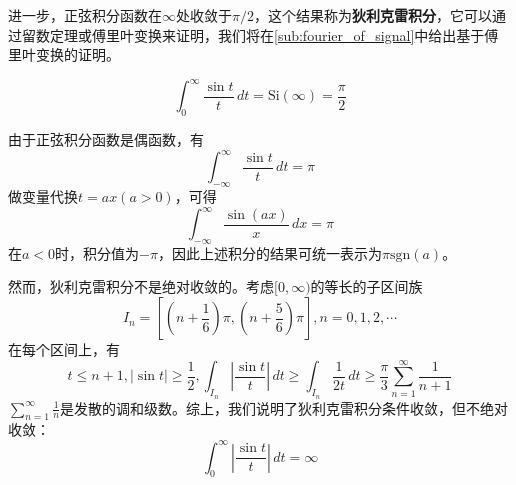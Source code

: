 进一步，正弦积分函数在$\infty$处收敛于$\pi/2$，这个结果称为\textbf{狄利克雷积分}，它可以通过留数定理或傅里叶变换来证明，我们将在\ref{sub:fourier_of_signal}中给出基于傅里叶变换的证明。
\begin{theorem}[狄利克雷积分]
    \[\int_{0}^{\infty}\frac{\sin t}{t}\,dt=\text{Si}(\infty)=\frac{\pi}{2}\]
\end{theorem}

\begin{corollary}
    由于正弦积分函数是偶函数，有
    \[\int_{-\infty}^{\infty}\frac{\sin t}{t}\,dt=\pi\]
    做变量代换$t=ax(a>0)$，可得
    \[\int_{-\infty}^{\infty}\frac{\sin (ax)}{x}\,dx=\pi\]
    在$a<0$时，积分值为$-\pi$，因此上述积分的结果可统一表示为$\pi\text{sgn}(a)$。
\end{corollary}

然而，狄利克雷积分不是绝对收敛的。考虑$[0,\infty)$的等长的子区间族
$$I_n=\left[(n+\frac{1}{6})\pi,(n+\frac{5}{6})\pi\right],n=0,1,2,\cdots$$
在每个区间上，有
$$t\leq n+1,|\sin t|\geq \frac{1}{2},\int_{I_n}\left|\frac{\sin t}{t}\right|\,dt \geq \int_{I_n}\frac{1}{2t}\,dt\geq\frac{\pi}{3}\sum_{n=1}^{\infty}\frac{1}{n+1}$$
$\sum_{n=1}^{\infty}\frac{1}{n}$是发散的调和级数。综上，我们说明了狄利克雷积分条件收敛，但不绝对收敛：
$$\int_{0}^{\infty}\left|\frac{\sin t}{t}\right|\,dt=\infty$$




